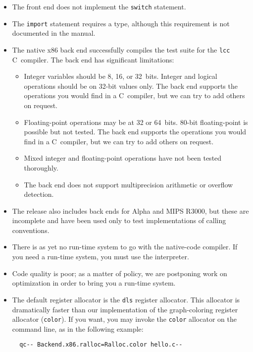 \documentclass{article}
\begin{document}
\begin{itemize}
\item
The front end does not implement the \texttt{switch} statement.
\item
The \texttt{import} statement requires a type, although this
requirement is not documented in the manual.
\item
The native x86 back end successfully compiles the test suite
for the \texttt{lcc} C~compiler.
The back end has significant limitations:
\begin{itemize}
\item
Integer variables should be 8, 16, or 32~bits.
Integer and logical operations should be on 32-bit values only.
The back end supports the operations you would find in a C~compiler,
but we can try to add others on request.
\item
Floating-point operations may be at 32 or 64~bits.
80-bit floating-point is possible but not tested.
The back end supports the operations you would find in a C~compiler,
but we can try to add others on request.
\item 
Mixed integer and floating-point operations have not been tested
thoroughly. 
\item
The back end does not support multiprecision arithmetic or overflow
detection. 
\end{itemize}
\item
The release also includes back ends for Alpha and MIPS R3000, but these are
incomplete and have been used only to test implementations of calling
conventions. 
\item
There is as yet no run-time system to go with the native-code
compiler.
If you need a run-time system, you must use the interpreter.
\item
 Code quality is poor; as a matter of policy, we are postponing
       work on optimization in order to bring you a run-time system.
\item
The default register allocator is the \texttt{dls} register allocator.
This allocator is dramatically faster than our implementation of the
graph-coloring register allocator (\texttt{color}).
If you want, you may invoke the \texttt{color} allocator on the
command line, as in the following example:
\begin{verbatim} 
  qc-- Backend.x86.ralloc=Ralloc.color hello.c--
\end{verbatim}
\end{itemize}
\end{document}
